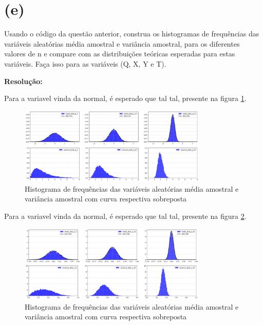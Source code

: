 \documentclass[]{abntex2}
\begin{document}
\section*{\textbf{(e)}}

\noindent Usando o código da questão anterior, construa os histogramas de frequências das
variáveis aleatórias média amostral e variância amostral, para os diferentes valores de n e compare com as distribuições teóricas esperadas para estas variáveis.
Faça isso para as variáveis (Q, X, Y e T).

\textbf{Resolução:}

Para a variavel vinda da normal, é esperado que tal tal, presente na figura \ref{fig:medvarQ}.

\begin{figure}
    \centering 
    \includegraphics[width=0.8\textwidth]{imgs/medvarQ.png}
    \caption{Histograma de frequências das variáveis aleatórias média amostral e variância amostral com curva respectiva sobreposta}
    \label{fig:medvarQ} %
\end{figure}

Para a variavel vinda da normal, é esperado que tal tal, presente na figura \ref{fig:medvarX}.

\begin{figure}
    \centering 
    \includegraphics[width=0.8\textwidth]{imgs/medvarX.png}
    \caption{Histograma de frequências das variáveis aleatórias média amostral e variância amostral com curva respectiva sobreposta}
    \label{fig:medvarX} %
\end{figure}
\end{document}
